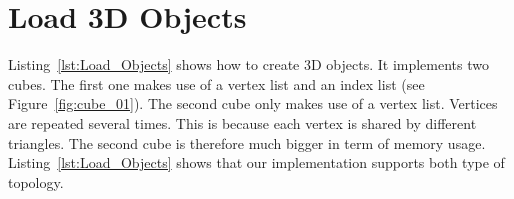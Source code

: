 \documentclass[11pt,oneside,a4paper,final]{article}
\begin{document}
\section{Load 3D Objects}
\label{sec:Load Objects}

Listing~\ref{lst:Load_Objects} shows how to create 3D objects. It 
implements 
two cubes. The first one makes use of a vertex list and an index list (see 
Figure~\ref{fig:cube_01}). The second cube only makes use of a vertex list. 
Vertices are repeated several times. This is because each vertex is shared by 
different triangles. The second cube is therefore much bigger in term of 
memory usage. Listing~\ref{lst:Load_Objects} shows that our implementation 
supports both type of topology.
\end{document}
